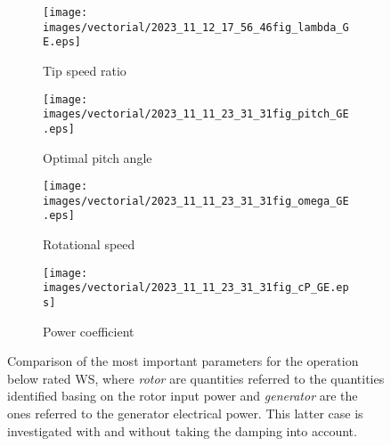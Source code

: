 \begin{figure}[htb]
  \begin{subfigure}{0.5\textwidth}
    \centering
    \texttt{[image: images/vectorial/2023\_11\_12\_17\_56\_46fig\_lambda\_GE.eps]}
    \caption{Tip speed ratio}
    \label{fig:2023_06_24_15_57_04fig_lambda_GE}
  \end{subfigure}
  \begin{subfigure}{0.5\textwidth}
    \centering
    \texttt{[image: images/vectorial/2023\_11\_11\_23\_31\_31fig\_pitch\_GE.eps]}
    \caption{Optimal pitch angle}
    \label{fig:2023_06_24_15_57_04fig_pitch_GE}
  \end{subfigure}
  \begin{subfigure}{0.5\textwidth}
    \centering
    \texttt{[image: images/vectorial/2023\_11\_11\_23\_31\_31fig\_omega\_GE.eps]}
    \caption{Rotational speed}
    \label{fig:2023_07_10_14_18_25fig_omega_GE}
  \end{subfigure}
  \begin{subfigure}{0.5\textwidth}
    \centering
    \texttt{[image: images/vectorial/2023\_11\_11\_23\_31\_31fig\_cP\_GE.eps]}
    \caption{Power coefficient}
    \label{fig:2023_06_24_15_57_04fig_cP_GE}
  \end{subfigure}
  \caption{Comparison of the most important parameters for the operation below rated WS, where \textit{rotor} are quantities referred to the quantities identified basing on the rotor input power and \textit{generator} are the ones referred to the generator electrical power. This latter case is investigated with and without taking the damping into account.}
  \label{fig:parameters_for_below_rated}
\end{figure}

